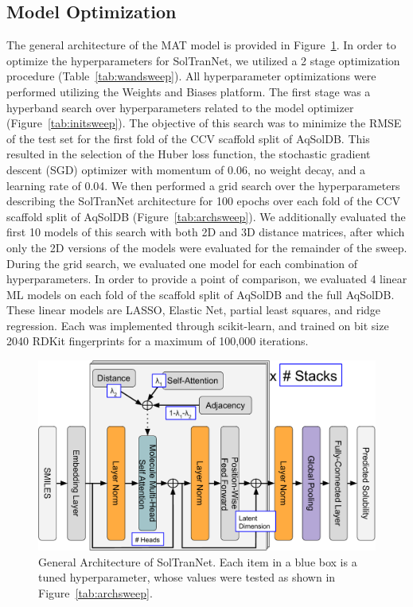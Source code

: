 \documentclass[journal=jcim,manuscript=applicationnotes]{achemso}
\begin{document}
\subsection{Model Optimization}
The general architecture of the MAT model is provided in Figure~\ref{fig:architecture}.
In order to optimize the hyperparameters for SolTranNet, we utilized a 2 stage optimization procedure (Table~\ref{tab:wandsweep}).
All hyperparameter optimizations were performed utilizing the Weights and Biases platform\cite{wandb}.
The first stage was a hyperband search over hyperparameters related to the model optimizer (Figure~\ref{tab:initsweep}). 
The objective of this search was to minimize the RMSE of the test set for the first fold of the CCV scaffold split of AqSolDB.
This resulted in the selection of the Huber loss function, the stochastic gradient descent (SGD) optimizer with momentum of 0.06, no weight decay, and a learning rate of 0.04.
We then performed a grid search over the hyperparameters describing the SolTranNet architecture for 100 epochs over each fold of the CCV scaffold split of AqSolDB (Figure~\ref{tab:archsweep}).
We additionally evaluated the first 10 models of this search with both 2D and 3D distance matrices, after which only the 2D versions of the models were evaluated for the remainder of the sweep.
During the grid search, we evaluated one model for each combination of hyperparameters.
In order to provide a point of comparison, we evaluated 4 linear ML models on each fold of the scaffold split of AqSolDB and the full AqSolDB.
These linear models are LASSO, Elastic Net, partial least squares, and ridge regression.
Each was implemented through scikit-learn\cite{scikit-learn}, and trained on bit size 2040 RDKit fingerprints for a maximum of 100,000 iterations.

\begin{figure}[tb]
    \centering
    \includegraphics[width=0.7\linewidth]{figures/soltrannet_architecture.pdf}
    \caption{General Architecture of SolTranNet. Each item in a blue box is a tuned hyperparameter, whose values were tested as shown in Figure~\ref{tab:archsweep}.}
    \label{fig:architecture}
\end{figure}
\end{document}

